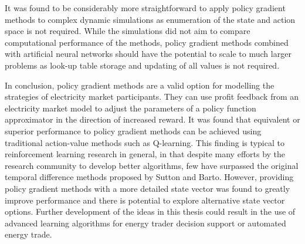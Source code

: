 It was found to be considerably more straightforward to apply policy
gradient methods to complex dynamic simulations as enumeration of the state
and action space is not required.  While the simulations did not aim to compare
computational performance of the methods, policy gradient methods combined with
artificial neural networks should have the potential to scale to much larger
problems as look-up table storage and updating of all values is not required.


In conclusion, policy gradient methods are a valid option for modelling the
strategies of electricity market participants.  They can use profit feedback
from an electricity market model to adjust the parameters of a policy function
approximator in the direction of increased reward.
It was found that equivalent or superior performance to policy gradient methods
can be achieved using traditional action-value methods such as Q-learning. This
finding is typical to reinforcement learning research in general, in that
despite many efforts by the research community to develop better algorithms, few have
surpassed the original temporal difference methods proposed by Sutton and Barto.
However, providing policy gradient methods with a more detailed state vector was
found to greatly improve performance and there is potential to explore
alternative state vector options.
Further development of the ideas in this thesis could result in the use
of advanced learning algorithms for energy trader decision support or
automated energy trade.


